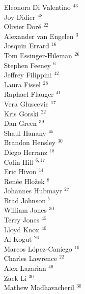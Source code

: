 \documentclass[PICOReport.tex]{subfiles}
\begin{document}
{\begin{multicols}{4}
Eleonora Di Valentino $^{43}$           \\
Joy Didier $^{48}$                      \\
Olivier Dor\'e $^{22}$                  \\
Alexander van Engelen $^{3}$           \\
Josquin Errard $^{16}$                  \\
Tom Essinger-Hileman $^{26}$            \\
Stephen Feeney $^{6}$                  \\
Jeffrey Filippini $^{42}$               \\
Laura Fissel $^{28}$                    \\
Raphael Flauger $^{41}$                 \\
Vera Gluscevic $^{17}$                  \\
Kris Gorski $^{22}$                     \\
Dan Green $^{39}$                       \\
Shaul Hanany $^{45}$                    \\
Brandon Hensley $^{30}$                 \\
Diego Herranz $^{18}$                   \\
Colin Hill $^{6,17}$                      \\
Eric Hivon $^{14}$                      \\
Ren\'{e}e  Hlo\v{z}ek $^{8}$           \\
Johannes Hubmayr $^{27}$                \\
Brad Johnson $^{7}$                    \\
William Jones $^{30}$                   \\
Terry Jones $^{45}$                     \\
Lloyd Knox $^{40}$                      \\
Al Kogut $^{26}$                        \\
Marcos L\'{o}pez-Caniego $^{10}$        \\
Charles Lawrence $^{22}$                \\
Alex Lazarian $^{49}$                   \\
Zack Li $^{30}$                         \\
Mathew Madhavacheril $^{30}$            \\

\end{multicols}}
\end{document}
